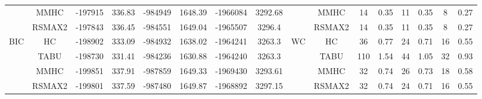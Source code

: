 \begin{table}[!hbp]
{\begin{tabular}{cc||cc|cc|cc||cc|cc|cc|cc}
& MMHC &	-197915 & 	336.83 & 	-984949 & 	1648.39 & 	-1966084 & 	3292.68 & 	& MMHC &	14 & 	0.35 & 	11 & 	0.35 & 	8 & 	0.27\tabularnewline													
& RSMAX2 &	-197843 & 	336.45 & 	-984551 & 	1649.04 & 	-1965507 & 	3296.4 & 	& RSMAX2 &	14 & 	0.35 & 	11 & 	0.35 & 	8 & 	0.27\tabularnewline													
\hline																										
\multirow{4}{*}{BIC} & HC &	-198902 & 	333.09 & 	-984932 & 	1638.02 & 	-1964241 & 	3263.3 & 	\multirow{4}{*}{WC} & HC &	36 & 	0.77 & 	24 & 	0.71 & 	16 & 	0.55\tabularnewline													
& TABU &	-198730 & 	331.41 & 	-984236 & 	1630.88 & 	-1964240 & 	3263.3 & 	& TABU &	110 & 	1.54 & 	44 & 	1.05 & 	32 & 	0.93\tabularnewline													
& MMHC &	-199851 & 	337.91 & 	-987859 & 	1649.33 & 	-1969430 & 	3293.61 & 	& MMHC &	32 & 	0.74 & 	26 & 	0.73 & 	18 & 	0.58\tabularnewline													
& RSMAX2 &	-199801 & 	337.59 & 	-987480 & 	1649.87 & 	-1968892 & 	3297.15 & 	& RSMAX2 &	32 & 	0.74 & 	24 & 	0.71 & 	16 & 	0.55\tabularnewline													
\hline																										
\end{tabular}																										
}																										
\end{table}																										


